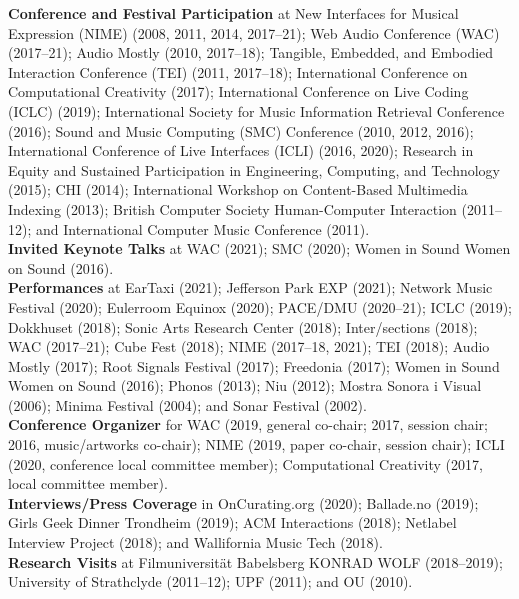 \documentclass[10pt, a4paper]{article}
\begin{document}
{\textbf{Conference and Festival Participation}} at New Interfaces for Musical Expression (NIME) (2008, 2011, 2014, 2017--21); Web Audio Conference (WAC) (2017--21); Audio Mostly (2010, 2017--18); Tangible, Embedded, and Embodied Interaction Conference (TEI) (2011, 2017--18); International Conference on Computational Creativity (2017); International Conference on Live Coding (ICLC) (2019); International Society for Music Information Retrieval Conference (2016); Sound and Music Computing (SMC) Conference (2010, 2012, 2016); International Conference of Live Interfaces (ICLI) (2016, 2020); Research in Equity and Sustained Participation in Engineering, Computing, and Technology (2015); CHI (2014); International Workshop on Content-Based Multimedia Indexing (2013); British Computer Society Human-Computer Interaction (2011--12); and International Computer Music Conference (2011).\\

{\textbf{Invited Keynote Talks}} at WAC (2021); SMC (2020); Women in Sound Women on Sound (2016).\\

{\textbf{Performances}} at EarTaxi (2021); Jefferson Park EXP (2021); Network Music Festival (2020); Eulerroom Equinox (2020); PACE/DMU (2020--21); ICLC (2019); Dokkhuset (2018); Sonic Arts Research Center (2018); Inter/sections (2018); WAC (2017--21); Cube Fest (2018); NIME (2017--18, 2021); TEI  (2018); Audio Mostly (2017); Root Signals Festival (2017); Freedonia (2017); Women in Sound Women on Sound (2016); Phonos (2013); Niu (2012); Mostra Sonora i Visual (2006); Minima Festival (2004); and Sonar Festival (2002).\\

{\textbf{Conference Organizer}} for WAC (2019, general co-chair; 2017, session chair; 2016, music/artworks co-chair); NIME (2019, paper co-chair, session chair); ICLI (2020, conference local committee member); Computational Creativity (2017, local committee member).\\

{\textbf{Interviews/Press Coverage}} in OnCurating.org (2020); Ballade.no (2019); Girls Geek Dinner Trondheim (2019); ACM Interactions (2018); Netlabel Interview Project (2018); and Wallifornia Music Tech (2018).\\

{\textbf{Research Visits}} at Filmuniversität Babelsberg KONRAD WOLF (2018--2019); University of Strathclyde (2011--12); UPF (2011); and OU (2010).\\
\end{document}

